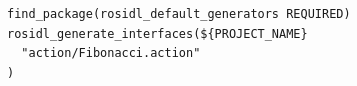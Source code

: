 \documentclass[preview,border=2pt]{standalone}
\begin{document}
\begin{lstlisting}[style=cmakestyle]
find_package(rosidl_default_generators REQUIRED)
rosidl_generate_interfaces(${PROJECT_NAME}
  "action/Fibonacci.action"
)
\end{lstlisting}
\end{document}
